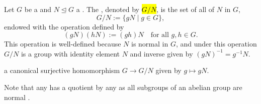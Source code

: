 \begin{definition} \label{definition:quotient_of_a_group_by_a_normal_subgroup}
Let $G$ be a  and $N \trianglelefteq G$ a .  
The , denoted by \hl{$G/N$}, is the set of all  of $N$ in $G$,
$$ G/N := \{ gN \mid g \in G \}, $$
endowed with the operation defined by
$$ (gN)(hN) := (gh)N \quad \text{for all } g,h \in G.  $$
This operation is well-defined because $N$ is normal in $G$, and under this operation $G/N$ is a group with identity element $N$ and inverse given by $(gN)^{-1} = g^{-1}N$.

 a canonical surjective homomorphism $G \to G/N$ given by $g \mapsto gN$. 

Note that any  has a quotient by any  as all subgroups of an abelian group are normal .

\end{definition}